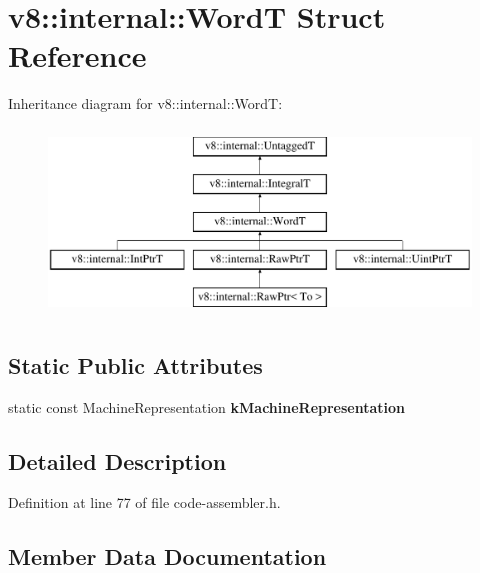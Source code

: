 \hypertarget{structv8_1_1internal_1_1WordT}{}\section{v8\+:\+:internal\+:\+:WordT Struct Reference}
\label{structv8_1_1internal_1_1WordT}
Inheritance diagram for v8\+:\+:internal\+:\+:WordT\+:\begin{figure}[H]
\begin{center}
\leavevmode
\includegraphics[height=5.000000cm]{structv8_1_1internal_1_1WordT}
\end{center}
\end{figure}
\subsection*{Static Public Attributes}
\begin{DoxyCompactItemize}
\item 
static const Machine\+Representation {\bfseries k\+Machine\+Representation}
\end{DoxyCompactItemize}


\subsection{Detailed Description}


Definition at line 77 of file code-\/assembler.\+h.



\subsection{Member Data Documentation}
\mbox{\label{structv8_1_1internal_1_1WordT_acc2179a17121db1c738c4eebef8761e3}} 
